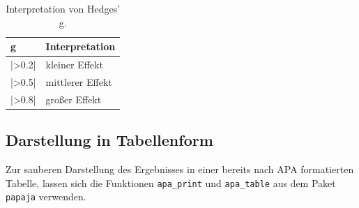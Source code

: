 \documentclass[
]{book}
\newenvironment{Shaded}{\begin{snugshade}}{\end{snugshade}}
\newcommand{\AttributeTok}[1]{\textcolor[rgb]{0.13,0.29,0.53}{#1}}
\newcommand{\FunctionTok}[1]{\textcolor[rgb]{0.13,0.29,0.53}{\textbf{#1}}}
\newcommand{\NormalTok}[1]{#1}
\newcommand{\OtherTok}[1]{\textcolor[rgb]{0.56,0.35,0.01}{#1}}
\newcommand{\SpecialCharTok}[1]{\textcolor[rgb]{0.81,0.36,0.00}{\textbf{#1}}}
\newcommand{\StringTok}[1]{\textcolor[rgb]{0.31,0.60,0.02}{#1}}
\begin{document}
\begin{table}[tbp]

\begin{center}
\begin{threeparttable}

\caption{\label{tab:unnamed-chunk-246}Interpretation von Hedges' g.}

\begin{tabular}{ll}
\toprule
g & \multicolumn{1}{c}{Interpretation}\\
\midrule
|>0.2| & kleiner Effekt\\
|>0.5| & mittlerer Effekt\\
|>0.8| & großer Effekt\\
\bottomrule
\end{tabular}

\end{threeparttable}
\end{center}

\end{table}

\subsection{Darstellung in Tabellenform}\label{darstellung-in-tabellenform-1}

Zur sauberen Darstellung des Ergebnisses in einer bereits nach APA formatierten Tabelle, lassen sich die Funktionen \texttt{apa\_print} und \texttt{apa\_table} aus dem Paket \texttt{papaja} verwenden.

\begin{Shaded}
\end{Shaded}
\end{document}
